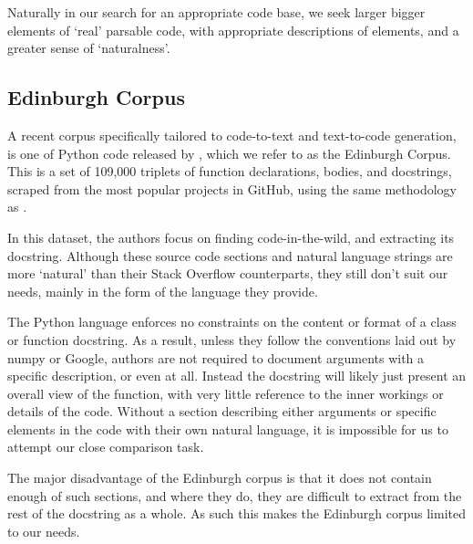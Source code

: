 Naturally in our search for an appropriate code base, we seek larger bigger elements of `real' parsable code, with appropriate descriptions of elements, and a greater sense of `naturalness'.

\subsection{Edinburgh Corpus}

A recent corpus specifically tailored to code-to-text and text-to-code generation, is one of Python code released by \citet{barone_parallel_2017}, which we refer to as the Edinburgh Corpus. 
This is a set of 109,000 triplets of function declarations, bodies, and docstrings, scraped from the most popular projects in GitHub, using the same methodology as \citet{bhoopchand_learning_2016}. 

In this dataset, the authors focus on finding code-in-the-wild, and extracting its docstring.
Although these source code sections and natural language strings are more `natural' than their Stack Overflow counterparts, they still don't suit our needs, mainly in the form of the language they provide. 

The Python language enforces no constraints on the content or format of a class or function docstring.
As a result, unless they follow the conventions laid out by numpy or Google, authors are not required to document arguments with a specific description, or even at all.
Instead the docstring will likely just present an overall view of the function, with very little reference to the inner workings or details of the code. 
Without a section describing either arguments or specific elements in the code with their own natural language, it is impossible for us to attempt our close comparison task.



The major disadvantage of the Edinburgh corpus is that it does not contain enough of such sections, and where they do, they are difficult to extract from the rest of the docstring as a whole.
As such this makes the Edinburgh corpus limited to our needs.


